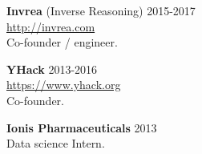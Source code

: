 \documentclass[margin, 10pt]{res} %
\begin{document}
\begin{resume}
\textbf{Invrea} (Inverse Reasoning) \hfill 2015-2017 \\
\url{http://invrea.com} \\
Co-founder / engineer.

\textbf{YHack} \hfill 2013-2016 \\
\url{https://www.yhack.org} \\
Co-founder.

\textbf{Ionis Pharmaceuticals} \hfill 2013 \\
Data science Intern.


\end{resume}
\end{document}
